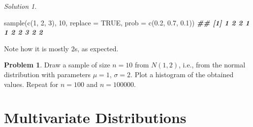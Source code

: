 \documentclass[
]{book}
\newenvironment{Shaded}{\begin{snugshade}}{\end{snugshade}}
\newcommand{\AttributeTok}[1]{\textcolor[rgb]{0.77,0.63,0.00}{#1}}
\newcommand{\ConstantTok}[1]{\textcolor[rgb]{0.00,0.00,0.00}{#1}}
\newcommand{\DecValTok}[1]{\textcolor[rgb]{0.00,0.00,0.81}{#1}}
\newcommand{\DocumentationTok}[1]{\textcolor[rgb]{0.56,0.35,0.01}{\textbf{\textit{#1}}}}
\newcommand{\FloatTok}[1]{\textcolor[rgb]{0.00,0.00,0.81}{#1}}
\newcommand{\FunctionTok}[1]{\textcolor[rgb]{0.00,0.00,0.00}{#1}}
\newcommand{\NormalTok}[1]{#1}
\theoremstyle{definition}
\theoremstyle{definition}
\theoremstyle{definition}
\newtheorem{exercise}{Problem}[chapter]
\theoremstyle{definition}
\theoremstyle{remark}
\newtheorem*{solution}{Solution}
\begin{document}
\begin{solution}
\begin{Shaded}
\begin{Highlighting}[]
\FunctionTok{sample}\NormalTok{(}\FunctionTok{c}\NormalTok{(}\DecValTok{1}\NormalTok{, }\DecValTok{2}\NormalTok{, }\DecValTok{3}\NormalTok{), }\DecValTok{10}\NormalTok{, }\AttributeTok{replace =} \ConstantTok{TRUE}\NormalTok{, }\AttributeTok{prob =} \FunctionTok{c}\NormalTok{(}\FloatTok{0.2}\NormalTok{, }\FloatTok{0.7}\NormalTok{, }\FloatTok{0.1}\NormalTok{))}
\DocumentationTok{\#\#  [1] 1 2 2 1 1 2 2 3 2 2}
\end{Highlighting}
\end{Shaded}

Note how it is mostly \(2\)s, as expected.
\end{solution}

\begin{exercise}
Draw a sample of size \(n=10\) from \(N(1,2)\), i.e., from the normal distribution
with parameters \(\mu=1\), \(\sigma = 2\). Plot a histogram of the obtained
values. Repeat for \(n=100\) and \(n=100000\).
\end{exercise}

\hypertarget{multivariate-distributions}{%
\section{Multivariate Distributions}\label{multivariate-distributions}}
\end{document}
